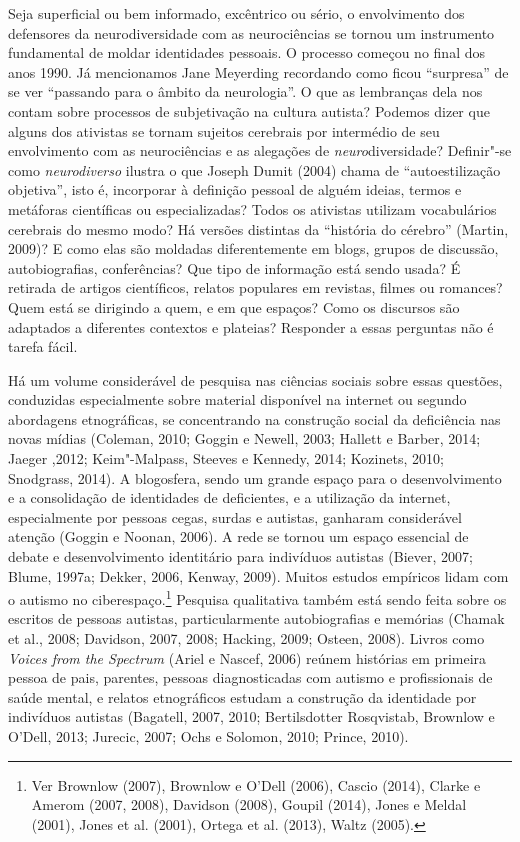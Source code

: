 Seja superficial ou bem informado, excêntrico ou sério, o envolvimento
dos defensores da neurodiversidade com as neurociências se tornou um
instrumento fundamental de moldar identidades pessoais. O processo
começou no final dos anos 1990. Já mencionamos Jane Meyerding recordando
como ficou ``surpresa'' de se ver ``passando para o âmbito da
neurologia''. O que as lembranças dela nos contam sobre processos de
subjetivação na cultura autista? Podemos dizer que alguns dos ativistas
se tornam sujeitos cerebrais por intermédio de seu envolvimento com as
neurociências e as alegações de \emph{neuro}diversidade? Definir"-se como
\emph{neurodiverso} ilustra o que Joseph Dumit (2004) chama de
``autoestilização objetiva'', isto é, incorporar à definição pessoal de
alguém ideias, termos e metáforas científicas ou especializadas? Todos
os ativistas utilizam vocabulários cerebrais do mesmo modo? Há versões
distintas da ``história do cérebro'' (Martin, 2009)? E como elas são
moldadas diferentemente em blogs, grupos de discussão, autobiografias,
conferências? Que tipo de informação está sendo usada? É retirada de
artigos científicos, relatos populares em revistas, filmes ou romances?
Quem está se dirigindo a quem, e em que espaços? Como os discursos são
adaptados a diferentes contextos e plateias? Responder a essas perguntas
não é tarefa fácil.

Há um volume considerável de pesquisa nas ciências sociais sobre essas
questões, conduzidas especialmente sobre material disponível na internet
ou segundo abordagens etnográficas, se concentrando na construção social
da deficiência nas novas mídias (Coleman, 2010; Goggin e Newell, 2003;
Hallett e Barber, 2014; Jaeger ,2012; Keim"-Malpass, Steeves e Kennedy,
2014; Kozinets, 2010; Snodgrass, 2014). A blogosfera, sendo um grande
espaço para o desenvolvimento e a consolidação de identidades de
deficientes, e a utilização da internet, especialmente por pessoas
cegas, surdas e autistas, ganharam considerável atenção (Goggin e
Noonan, 2006). A rede se tornou um espaço essencial de debate e
desenvolvimento identitário para indivíduos autistas (Biever, 2007;
Blume, 1997a; Dekker, 2006, Kenway, 2009). Muitos estudos empíricos
lidam com o autismo no ciberespaço.\footnote[21]{Ver Brownlow (2007), Brownlow e O'Dell (2006), Cascio (2014),
Clarke e Amerom (2007, 2008), Davidson (2008), Goupil (2014), Jones e
Meldal (2001), Jones et al. (2001), Ortega et al. (2013), Waltz (2005).} Pesquisa
qualitativa também está sendo feita sobre os escritos de pessoas
autistas, particularmente autobiografias e memórias (Chamak et al.,
2008; Davidson, 2007, 2008; Hacking, 2009; Osteen, 2008). Livros como
\emph{Voices from the Spectrum} (Ariel e Nascef, 2006) reúnem histórias
em primeira pessoa de pais, parentes, pessoas diagnosticadas com autismo
e profissionais de saúde mental, e relatos etnográficos estudam a
construção da identidade por indivíduos autistas (Bagatell, 2007, 2010;
Bertilsdotter Rosqvistab, Brownlow e O'Dell, 2013; Jurecic, 2007; Ochs e
Solomon, 2010; Prince, 2010).

